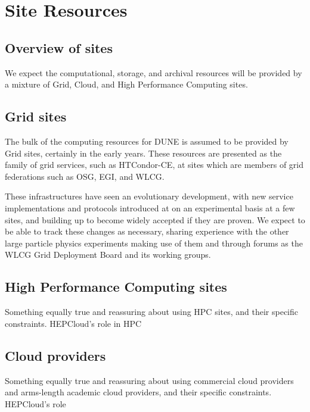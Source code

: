 \chapter{Site Resources }
\label{ch:sites}


\section{Overview of sites}
\label{sec:sites:overview}

We expect the computational, storage, and archival resources will be provided by a mixture of Grid, Cloud, and High Performance Computing sites. 

\section{Grid sites}
\label{sec:sites:grid}  %

The bulk of the computing resources for DUNE is assumed to be provided by Grid sites, certainly in the early years. These resources are presented as the family of grid services, such as HTCondor-CE, at sites which are members of grid federations such as OSG, EGI, and WLCG.

These infrastructures have seen an evolutionary development, with new service implementations and protocols introduced at on an experimental basis at a few sites, and building up to become widely accepted if they are proven. We expect to be able to track these changes as necessary, sharing experience with the other large particle physics experiments making use of them and through forums as the WLCG Grid Deployment Board and its working groups.

\section{High Performance Computing sites}
\label{sec:sites:hpc}

Something equally true and reassuring about using HPC sites, and their specific constraints. HEPCloud's role in HPC

\section{Cloud providers}
\label{sec:sites:cloud}

Something equally true and reassuring about using commercial cloud providers and arms-length academic cloud providers, and their specific constraints. HEPCloud's role
